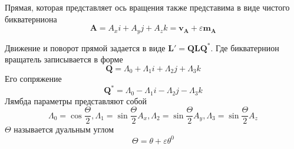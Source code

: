   Прямая, которая представляет ось вращения также представима в виде чистого бикватерниона
  \begin{equation*}
    \mathbf{A} = A_x i + A_y j + A_z k = \mathbf{v}_\mathbf{A} + \varepsilon \mathbf{m}_\mathbf{A}
  \end{equation*}

  Движение и поворот прямой задается в виде $\mathbf{L}' = \mathbf{QLQ^*}$. Где бикватернион вращатель записывается в форме
  \begin{equation*}
    \mathbf{Q} = \Lambda_0 + \Lambda_1 i + \Lambda_2 j + \Lambda_3 k
  \end{equation*}
  Его сопряжение 
  \begin{equation*}
    \mathbf{Q}^* = \Lambda_0 - \Lambda_1 i - \Lambda_2 j - \Lambda_3 k
  \end{equation*}
  Лямбда параметры представляют собой
  \begin{equation*}
    \Lambda_0 = \cos{\frac{\Theta}{2}}, \Lambda_1 = \sin{\frac{\Theta}{2}}A_x, \Lambda_2 = \sin{\frac{\Theta}{2}}A_y, \Lambda_3 = \sin{\frac{\Theta}{2}}A_z
  \end{equation*}
  $\Theta$ называется дуальным углом  
  \begin{equation*}
    \Theta  = \theta + \varepsilon \theta^0
  \end{equation*}








